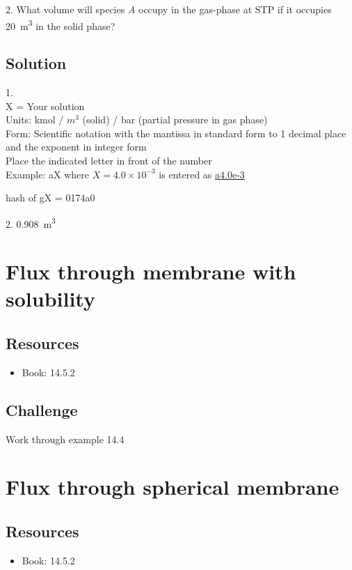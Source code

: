 2. What volume will species \emph{A} occupy in the gas-phase at STP if it occupies \SI{20}{\cubic\meter} in the solid phase?

\subsection*{Solution}
1.\\
X = Your solution\\
Units: kmol / $m^3$ (solid) / bar (partial pressure in gas phase)\\
Form: Scientific notation with the mantissa in standard form to 1 decimal place and the exponent in integer form\\
Place the indicated letter in front of the number\\
Example: aX where $X=4.0 \times 10^{-3}$ is entered as \href{http://www.wolframalpha.com/input/?i=md5+hash+of+\%22a4.0e-3\%22}{a4.0e-3}

hash of gX = 0174a0

2. \SI{0.908}{\cubic\meter}




\newpage
\section{Flux through membrane with solubility}

\subsection*{Resources}
\begin{itemize}
    \item Book: 14.5.2
\end{itemize}

\subsection*{Challenge}
Work through example 14.4




\newpage
\section{Flux through spherical membrane}

\subsection*{Resources}
\begin{itemize}
    \item Book: 14.5.2
\end{itemize}

